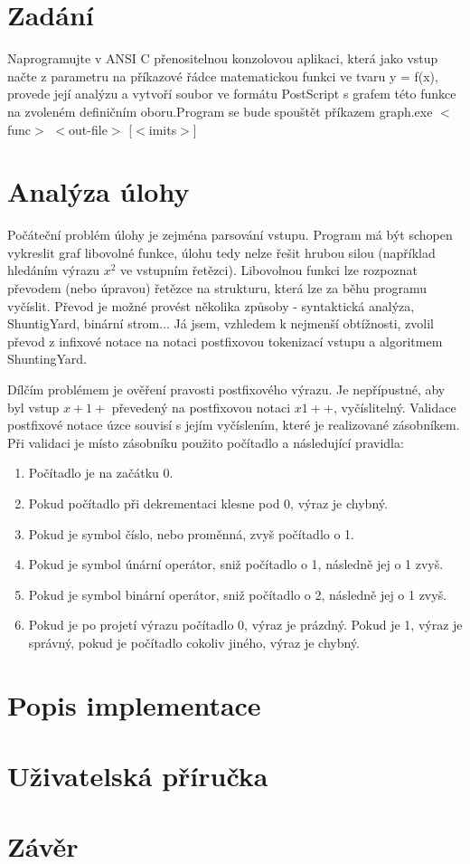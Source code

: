 \documentclass 	[a4paper,12pt]	{article}
\begin{document}
\section{Zadání}
Naprogramujte v ANSI C přenositelnou konzolovou aplikaci, která jako vstup načte z parametru na příkazové řádce matematickou funkci ve tvaru y = f(x), provede její analýzu a vytvoří
soubor ve formátu PostScript s grafem této funkce na zvoleném definičním oboru.Program se bude spouštět příkazem graph.exe $<$func$>$ $<$out-file$>$ [$<$imits$>$] 
\section{Analýza úlohy}
Počáteční problém úlohy je zejména parsování vstupu. Program má být schopen vykreslit graf libovolné funkce, úlohu tedy nelze řešit hrubou silou (například hledáním výrazu ${x}^{2}$ ve vstupním řetězci). Libovolnou funkci lze rozpoznat převodem (nebo úpravou) řetězce na strukturu, která lze za běhu programu vyčíslit. Převod je možné provést několika způsoby - syntaktická analýza, ShuntigYard, binární strom... Já jsem, vzhledem k nejmenší obtížnosti, zvolil převod z infixové notace na notaci postfixovou tokenizací vstupu a algoritmem ShuntingYard.

Dílčím problémem je ověření pravosti postfixového výrazu. Je nepřípustné, aby byl vstup $x+1+$ převedený na postfixovou notaci $x1++$, vyčíslitelný. Validace postfixové notace úzce souvisí s jejím vyčíslením, které je realizované zásobníkem. Při validaci je místo zásobníku použito počítadlo a následující pravidla:
\begin{enumerate}
\item Počítadlo je na začátku 0.
\item Pokud počítadlo při dekrementaci klesne pod 0, výraz je chybný.
\item Pokud je symbol číslo, nebo proměnná, zvyš počítadlo o 1.
\item Pokud je symbol únární operátor, sniž počítadlo o 1, následně jej o 1 zvyš.
\item Pokud je symbol binární operátor, sniž počítadlo o 2, následně jej o 1 zvyš.
\item Pokud je po projetí výrazu počítadlo 0, výraz je prázdný. Pokud je 1, výraz je správný, pokud je počítadlo cokoliv jiného, výraz je chybný.
\end{enumerate}  


\section{Popis implementace}
\section{Uživatelská příručka}
\section{Závěr}
\end{document}
